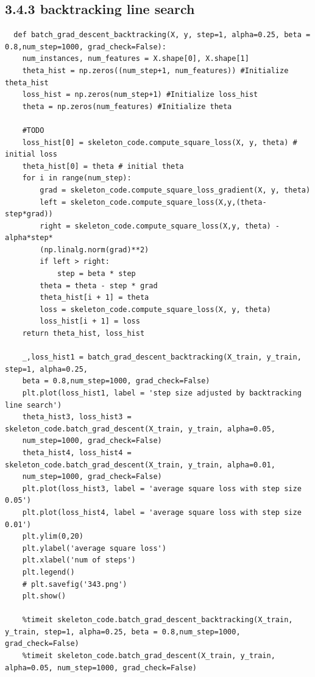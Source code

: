 \documentclass{article}
\begin{document}
\subsection{3.4.3 backtracking line search}
\begin{verbatim}
  def batch_grad_descent_backtracking(X, y, step=1, alpha=0.25, beta = 0.8,num_step=1000, grad_check=False):
    num_instances, num_features = X.shape[0], X.shape[1]
    theta_hist = np.zeros((num_step+1, num_features)) #Initialize theta_hist
    loss_hist = np.zeros(num_step+1) #Initialize loss_hist
    theta = np.zeros(num_features) #Initialize theta
    
    #TODO
    loss_hist[0] = skeleton_code.compute_square_loss(X, y, theta) # initial loss
    theta_hist[0] = theta # initial theta
    for i in range(num_step):
        grad = skeleton_code.compute_square_loss_gradient(X, y, theta)
        left = skeleton_code.compute_square_loss(X,y,(theta-step*grad)) 
        right = skeleton_code.compute_square_loss(X,y, theta) - alpha*step*
        (np.linalg.norm(grad)**2)
        if left > right:
            step = beta * step
        theta = theta - step * grad
        theta_hist[i + 1] = theta
        loss = skeleton_code.compute_square_loss(X, y, theta)
        loss_hist[i + 1] = loss
    return theta_hist, loss_hist
    
    _,loss_hist1 = batch_grad_descent_backtracking(X_train, y_train, step=1, alpha=0.25,
    beta = 0.8,num_step=1000, grad_check=False)
    plt.plot(loss_hist1, label = 'step size adjusted by backtracking line search')
    theta_hist3, loss_hist3 = skeleton_code.batch_grad_descent(X_train, y_train, alpha=0.05,
    num_step=1000, grad_check=False)
    theta_hist4, loss_hist4 = skeleton_code.batch_grad_descent(X_train, y_train, alpha=0.01,
    num_step=1000, grad_check=False)
    plt.plot(loss_hist3, label = 'average square loss with step size 0.05')
    plt.plot(loss_hist4, label = 'average square loss with step size 0.01')
    plt.ylim(0,20)
    plt.ylabel('average square loss')
    plt.xlabel('num of steps')
    plt.legend()
    # plt.savefig('343.png')
    plt.show()
    
    %timeit skeleton_code.batch_grad_descent_backtracking(X_train, y_train, step=1, alpha=0.25, beta = 0.8,num_step=1000, grad_check=False)
    %timeit skeleton_code.batch_grad_descent(X_train, y_train, alpha=0.05, num_step=1000, grad_check=False)
\end{verbatim}
\end{document}
